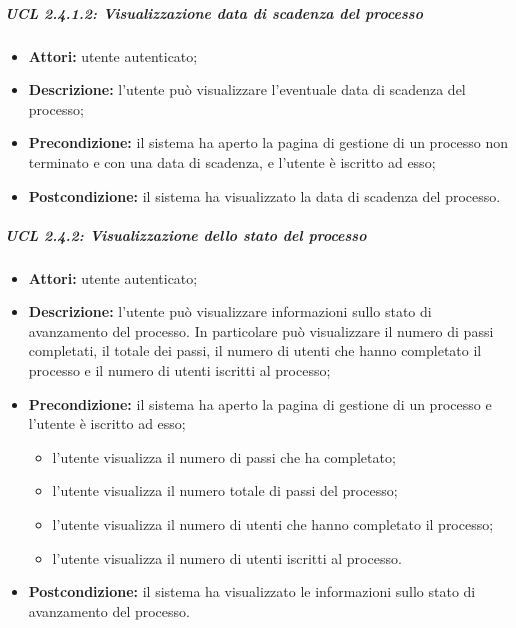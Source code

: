 \subparagraph{UCL 2.4.1.2: Visualizzazione data di scadenza del processo}
\begin{itemize}
\item \textbf{Attori:} utente autenticato;
\item \textbf{Descrizione:} l'utente può visualizzare l'eventuale data di scadenza del processo;
\item \textbf{Precondizione:} il sistema ha aperto la pagina di gestione di un processo  non terminato e con una data di scadenza, e l'utente è iscritto ad esso;
\item \textbf{Postcondizione:} il sistema ha visualizzato la data di scadenza del processo.
\end{itemize}

\subparagraph{UCL 2.4.2: Visualizzazione dello stato del processo}
\begin{itemize}
\item \textbf{Attori:} utente autenticato;
\item \textbf{Descrizione:} l'utente può visualizzare informazioni sullo stato di avanzamento del processo. In particolare può visualizzare il numero di passi completati, il totale dei passi, il numero di utenti che hanno completato il processo e il numero di utenti iscritti al processo;
\item \textbf{Precondizione:} il sistema ha aperto la pagina di gestione di un processo e l'utente è iscritto ad esso;
\begin{itemize}
\item l'utente visualizza il numero di passi che ha completato;
\item l'utente visualizza il numero totale di passi del processo;
\item l'utente visualizza il numero di utenti che hanno completato il processo;
\item l'utente visualizza il numero di utenti iscritti al processo.
\end{itemize}
\item \textbf{Postcondizione:} il sistema ha visualizzato le informazioni sullo stato di avanzamento del processo.
\end{itemize}

